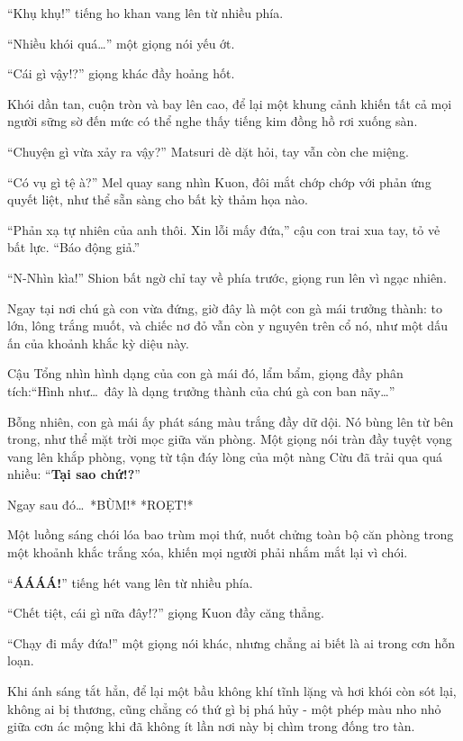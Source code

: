 \documentclass[../main.tex]{subfiles}
\begin{document}
``Khụ khụ!'' tiếng ho khan vang lên từ nhiều phía.

``Nhiều khói quá\dots'' một giọng nói yếu ớt.

``Cái gì vậy!?'' giọng khác đầy hoảng hốt.

Khói dần tan, cuộn tròn và bay lên cao, để lại một khung cảnh khiến tất cả mọi người sững sờ đến mức có thể nghe thấy tiếng kim đồng hồ rơi xuống sàn.

``Chuyện gì vừa xảy ra vậy?'' Matsuri dè dặt hỏi, tay vẫn còn che miệng.

``Có vụ gì tệ à?'' Mel quay sang nhìn Kuon, đôi mắt chớp chớp với phản ứng quyết liệt, như thể sẵn sàng cho bất kỳ thảm họa nào.

``Phản xạ tự nhiên của anh thôi. Xin lỗi mấy đứa,'' cậu con trai xua tay, tỏ vẻ bất lực. ``Báo động giả.''

``N-Nhìn kìa!'' Shion bất ngờ chỉ tay về phía trước, giọng run lên vì ngạc nhiên.

Ngay tại nơi chú gà con vừa đứng, giờ đây là một con gà mái trưởng thành: to lớn, lông trắng muốt, và chiếc nơ đỏ vẫn còn y nguyên trên cổ nó, như một dấu ấn của khoảnh khắc kỳ diệu này.


Cậu Tổng nhìn hình dạng của con gà mái đó, lẩm bẩm, giọng đầy phân tích:``Hình như\dots\ đây là dạng trưởng thành của chú gà con ban nãy\dots''

Bỗng nhiên, con gà mái ấy phát sáng màu trắng đầy dữ dội. Nó bùng lên từ bên trong, như thể mặt trời mọc giữa văn phòng. Một giọng nói tràn đầy tuyệt vọng vang lên khắp phòng, vọng từ tận đáy lòng của một nàng Cừu đã trải qua quá nhiều: ``\textbf{Tại sao chứ!?}''

Ngay sau đó\dots\ *BÙM!* *ROẸT!*

Một luồng sáng chói lóa bao trùm mọi thứ, nuốt chửng toàn bộ căn phòng trong một khoảnh khắc trắng xóa, khiến mọi người phải nhắm mắt lại vì chói.

``\textbf{ÁÁÁÁ!}'' tiếng hét vang lên từ nhiều phía.

``Chết tiệt, cái gì nữa đây!?'' giọng Kuon đầy căng thẳng.

``Chạy đi mấy đứa!'' một giọng nói khác, nhưng chẳng ai biết là ai trong cơn hỗn loạn.

Khi ánh sáng tắt hẳn, để lại một bầu không khí tĩnh lặng và hơi khói còn sót lại, không ai bị thương, cũng chẳng có thứ gì bị phá hủy - một phép màu nho nhỏ giữa cơn ác mộng khi đã không ít lần nơi này bị chìm trong đống tro tàn.
\end{document}
